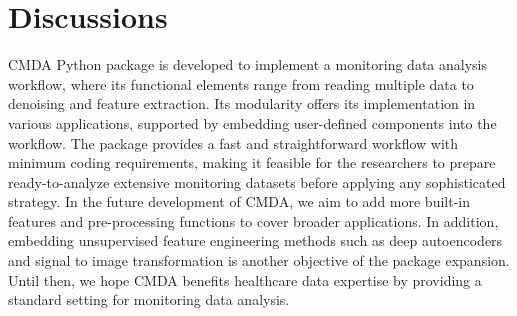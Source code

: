 \documentclass{article}
\begin{document}
\section{Discussions}
CMDA Python package is developed to implement a monitoring data analysis workflow, where its functional elements range from reading multiple data to denoising and feature extraction. Its modularity offers its implementation in various applications, supported by embedding user-defined components into the workflow. The package provides a fast and straightforward workflow with minimum coding requirements, making it feasible for the researchers to prepare ready-to-analyze extensive monitoring datasets before applying any sophisticated strategy. 
In the future development of CMDA, we aim to add more built-in features and pre-processing functions to cover broader applications. In addition, embedding unsupervised feature engineering methods such as deep autoencoders and signal to image transformation is another objective of the package expansion. Until then, we hope CMDA benefits healthcare data expertise by providing a standard setting for monitoring data analysis.







\end{document}
